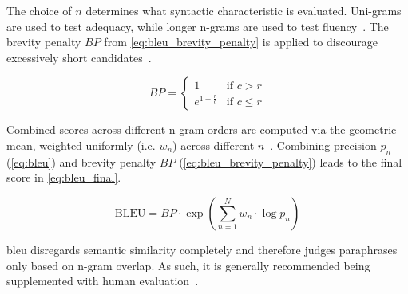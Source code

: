 The choice of $n$ determines what syntactic characteristic is evaluated.
Uni-grams are used to test adequacy, while longer n-grams are used to test fluency~\citep{papineni_bleu_2001}. 
The brevity penalty $BP$ from \autoref{eq:bleu_brevity_penalty} is applied to discourage excessively short candidates~\citep{papineni_bleu_2001}.

\begin{equation}
    BP = \begin{cases}
        1 & \text{if } c > r \\
        e^{1 - \frac{r}{c}} & \text{if } c \leq r
    \end{cases}
\label{eq:bleu_brevity_penalty}
\end{equation}

Combined scores across different n-gram orders are computed via the geometric mean, weighted uniformly (i.e. $w_n$) across different $n$~\citep{papineni_bleu_2001,banerjee_METEOR_2005}.
Combining precision $p_n$ (\autoref{eq:bleu}) and brevity penalty $BP$ (\autoref{eq:bleu_brevity_penalty}) leads to the final score in \autoref{eq:bleu_final}.

\begin{equation}
    \text{BLEU} = BP \cdot \exp\left(\sum_{n=1}^{N} w_n \cdot \log p_n\right)
\label{eq:bleu_final}
\end{equation}

\ac{bleu} disregards semantic similarity completely and therefore judges paraphrases only based on n-gram overlap. 
As such, it is generally recommended being supplemented with human evaluation~\citep{zhou_paraphrase_2021}.






